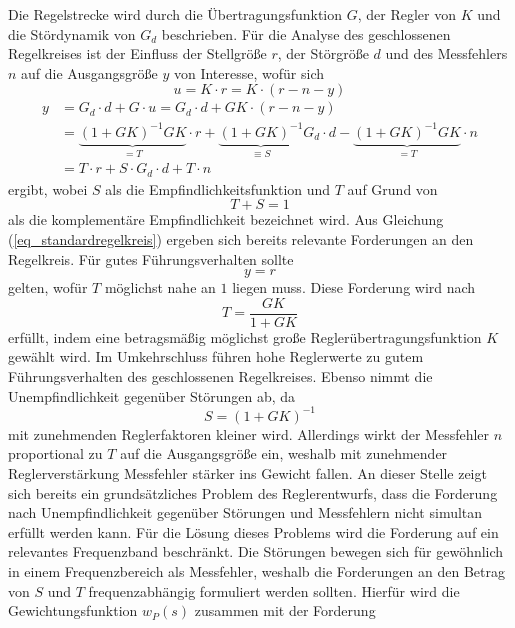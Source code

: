 Die Regelstrecke wird durch die Übertragungsfunktion $G$, der Regler von $K$ und die Stördynamik von $G_d$ beschrieben. Für die Analyse des geschlossenen Regelkreises ist der Einfluss der Stellgröße $r$, der Störgröße $d$ und des Messfehlers $n$ auf die Ausgangsgröße $y$ von Interesse, wofür sich 
\begin{equation}
u = K \cdot r = K \cdot ( r - n - y)
\end{equation}
\begin{equation}
\label{eq_standardregelkreis}
\begin{split}
y &= G_d \cdot d + G\cdot u =  G_d\cdot d + GK\cdot (r - n - y) \\
&= \underbrace{(1 + GK)^{-1}GK}_{= T} \cdot r + \underbrace{(1 + GK)^{-1}}_{\equiv S} G_d \cdot d - \underbrace{(1 + GK)^{-1}GK}_{= T} \cdot n \\
&= T\cdot r + S\cdot G_d \cdot d + T \cdot n
\end{split}
\end{equation}
ergibt, wobei $S$ als die Empfindlichkeitsfunktion und $T$ auf Grund von
\begin{equation}
\label{eq_empfindlichkeit}
T + S = 1
\end{equation}
als die komplementäre Empfindlichkeit bezeichnet wird. Aus Gleichung (\ref{eq_standardregelkreis}) ergeben sich bereits relevante Forderungen an den Regelkreis. Für gutes Führungsverhalten sollte 
\begin{equation}
y = r
\end{equation}
gelten, wofür $T$ möglichst nahe an $1$ liegen muss. Diese Forderung wird nach
\begin{equation}
T = \frac{GK}{1+GK}
\end{equation}
erfüllt, indem eine betragsmäßig möglichst große Reglerübertragungsfunktion $K$ gewählt wird. Im Umkehrschluss führen hohe Reglerwerte zu gutem Führungsverhalten des geschlossenen Regelkreises. Ebenso nimmt die Unempfindlichkeit gegenüber Störungen ab, da
\begin{equation}
S = (1+GK)^{-1}
\end{equation}
mit zunehmenden Reglerfaktoren kleiner wird. Allerdings wirkt der Messfehler $n$ proportional zu $T$ auf die Ausgangsgröße ein, weshalb mit zunehmender Reglerverstärkung Messfehler stärker ins Gewicht fallen. An dieser Stelle zeigt sich bereits ein grundsätzliches Problem des Reglerentwurfs, dass die Forderung nach Unempfindlichkeit gegenüber Störungen und Messfehlern nicht simultan erfüllt werden kann. Für die Lösung dieses Problems wird die Forderung auf ein relevantes Frequenzband beschränkt. Die Störungen bewegen sich für gewöhnlich in einem Frequenzbereich als Messfehler, weshalb die Forderungen an den Betrag von $S$ und $T$ frequenzabhängig formuliert werden sollten. Hierfür wird die Gewichtungsfunktion $w_P(s)$ zusammen mit der Forderung
